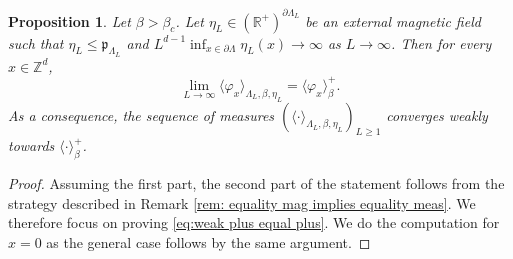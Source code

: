 \documentclass[11pt,a4paper]{article}
\newtheorem{proposition}[theorem]{Proposition}
\theoremstyle{definition}
\numberwithin{equation}{section}
\begin{document}
\begin{proposition}\label{prop: weak plus measure}
Let $\beta>\beta_c$. Let $\eta_L \in (\mathbb{R}^+)^{\partial \Lambda_L}$ be an external magnetic field such that $\eta_L\leq \mathfrak{p}_{\Lambda_L}$ and $L^{d-1}\inf_{x\in \partial \Lambda}\eta_L(x)\to\infty$ as $L\to \infty$. Then for every $x\in \mathbb Z^d$, 
\begin{equation}\label{eq:weak plus equal plus}
\lim_{L\to\infty}\langle \varphi_x \rangle_{\Lambda_L,\beta,\eta_L}= \langle \varphi_x \rangle^+_{\beta}.    
\end{equation}
As a consequence, the sequence of measures $(\langle \cdot \rangle_{\Lambda_L,\beta,\eta_L})_{L\geq 1}$ converges weakly towards $\langle\cdot\rangle_\beta^+$.
\end{proposition}
\begin{proof} Assuming the first part, the second part of the statement follows from the strategy described in Remark \ref{rem: equality mag implies equality meas}. We therefore focus on proving \eqref{eq:weak plus equal plus}. We do the computation for $x=0$ as the general case follows by the same argument. 


\end{proof}
\end{document}
